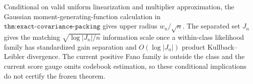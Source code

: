 Conditional on valid uniform linearization and multiplier approximation, the Gaussian moment-generating-function calculation in \(\texttt{thm:exact-covariance-packing}\) gives upper radius \(w_n/\sqrt n\).  The separated set \(J_n\) gives the matching \(\sqrt{\log|J_n|/n}\) information scale once a within-class likelihood family has standardized gain separation and \(O(\log|J_n|)\) product Kullback--Leibler divergence.  The current positive Fano family is outside the class and the current score gauge omits codebook estimation, so these conditional implications do not certify the frozen theorem.